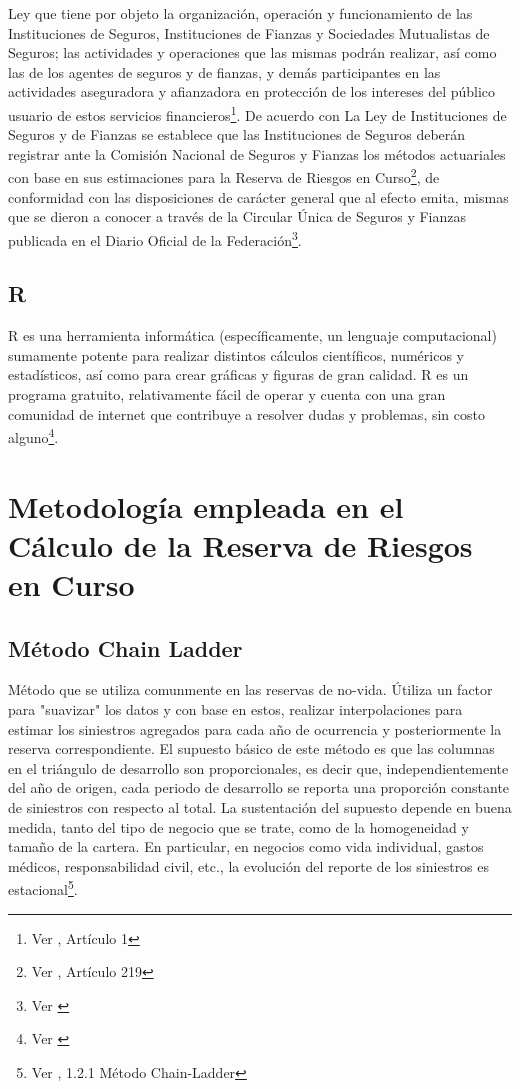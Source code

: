 \documentclass[11pt,twoside,openright,spanish]{report}
\numberwithin{equation}{chapter}
\numberwithin{figure}{chapter}
\numberwithin{table}{chapter}
\begin{document}
	Ley que tiene por objeto la organización, operación y funcionamiento de las Instituciones de Seguros, Instituciones de Fianzas y Sociedades Mutualistas de Seguros; las actividades y operaciones que las mismas podrán realizar, así como las de los agentes de seguros y de fianzas, y demás participantes en las actividades aseguradora y afianzadora en protección de los intereses del público usuario de estos servicios financieros\footnote{Ver \citet{GLisf}, Artículo 1}. De acuerdo con La Ley de Instituciones de Seguros y de Fianzas se establece que las Instituciones de Seguros deberán registrar ante la Comisión Nacional de Seguros y Fianzas los métodos actuariales con base en sus estimaciones para la Reserva de Riesgos en Curso\footnote{Ver \citet{FAmis}, Artículo 219}, de conformidad con las disposiciones de carácter general que al efecto emita, mismas que se dieron a conocer a través de la Circular Única de Seguros y Fianzas publicada en el Diario Oficial de la Federación\footnote{Ver \citet{HCusf}}.
	
	
	\section{R}

	R es una herramienta informática (específicamente, un lenguaje computacional) sumamente potente para realizar distintos cálculos científicos, numéricos y estadísticos, así como para crear gráficas y figuras de gran calidad. R es un programa gratuito, relativamente fácil de operar y cuenta con una gran comunidad de internet que contribuye a resolver dudas y problemas, sin costo alguno\footnote{Ver \citet{KR}}. 
	

	\chapter{Metodología empleada en el Cálculo de la Reserva de Riesgos en Curso}\label{tcyedb}
	
	\section{Método Chain Ladder}

	Método que se utiliza comunmente en las reservas de no-vida. Útiliza un factor para "suavizar" los datos y con base en estos, realizar interpolaciones para estimar los siniestros agregados para cada año de ocurrencia y posteriormente la reserva correspondiente. El supuesto básico de este método es que las columnas en el triángulo de desarrollo son proporcionales, es decir que, independientemente del año de origen, cada periodo de desarrollo se reporta una proporción constante de siniestros con respecto al total. La sustentación del supuesto depende en buena medida, tanto del tipo de negocio que se trate, como de la homogeneidad y tamaño de la cartera. En particular, en negocios como vida individual, gastos médicos, responsabilidad civil, etc., la evolución del reporte de los siniestros es estacional\footnote{Ver \citet{LChainLadder}, 1.2.1 Método Chain-Ladder}.  
\end{document}
